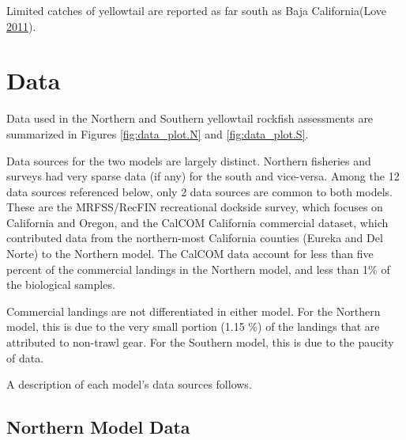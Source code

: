 \documentclass[12pt,]{article}
\begin{document}
Limited catches of yellowtail are reported as far south as Baja
California(Love \protect\hyperlink{ref-Love2011}{2011}).

\newpage

\captionsetup[table]{labelformat=empty,justification=raggedright,font=bf, singlelinecheck=false}

\section{Data}\label{data}

Data used in the Northern and Southern yellowtail rockfish assessments
are summarized in Figures \ref{fig:data_plot.N} and
\ref{fig:data_plot.S}.

Data sources for the two models are largely distinct. Northern fisheries
and surveys had very sparse data (if any) for the south and vice-versa.
Among the 12 data sources referenced below, only 2 data sources are
common to both models. These are the MRFSS/RecFIN recreational dockside
survey, which focuses on California and Oregon, and the CalCOM
California commercial dataset, which contributed data from the
northern-most California counties (Eureka and Del Norte) to the Northern
model. The CalCOM data account for less than five percent of the
commercial landings in the Northern model, and less than 1\% of the
biological samples.

Commercial landings are not differentiated in either model. For the
Northern model, this is due to the very small portion (1.15 \%) of the
landings that are attributed to non-trawl gear. For the Southern model,
this is due to the paucity of data.

A description of each model's data sources follows.

\subsection{Northern Model Data}\label{northern-model-data}

\vspace{.5cm}
\end{document}
